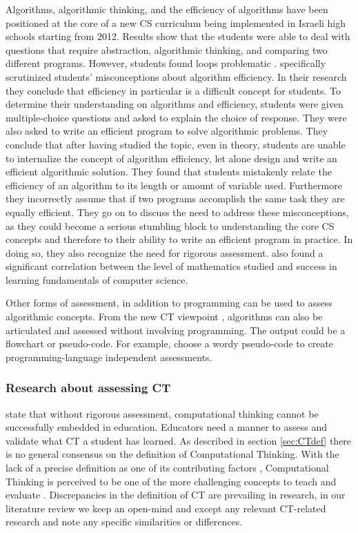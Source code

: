 Algorithms, algorithmic thinking, and the efficiency of algorithms have been positioned at the core of a new CS curriculum being implemented in Israeli high schools starting from 2012. Results show that the students were able to deal with questions that require abstraction, algorithmic thinking, and comparing two different programs. However, students found loops problematic \cite{zur-burgury2013israelExam}.  specifically scrutinized students' misconceptions about algorithm efficiency. In their research they conclude that efficiency in particular is a difficult concept for students. To determine their understanding on algorithms and efficiency, students were given multiple-choice questions and asked to explain the choice of response. They were also asked to write an efficient program to solve algorithmic problems. They conclude that after having studied the topic, even in theory, students are unable to internalize the concept of algorithm efficiency, let alone design and write an efficient algorithmic solution. They found that students mistakenly relate the efficiency of an algorithm to its length or amount of variable used. Furthermore they incorrectly assume that if two programs accomplish the same task they are equally efficient. They go on to discuss the need to address these misconceptions, as they could become a serious stumbling block to understanding the core CS concepts and therefore to their ability to write an efficient program in practice. In doing so, they also recognize the need for rigorous assessment. \cite{gal2002efficiency} also found a significant correlation between the level of mathematics studied and success in learning fundamentals of computer science.


Other forms of assessment, in addition to programming can be used to assess algorithmic concepts. From the new CT viewpoint \cite{denning2017remaining}, algorithms can also be articulated and assessed without involving programming. The output could be a flowchart \cite{Smetsers2017} or pseudo-code. For example,  choose a wordy pseudo-code to create programming-language independent assessments.


\subsubsection{Research about assessing CT}

 state that without rigorous assessment, computational thinking cannot be successfully embedded in education. Educators need a manner to assess and validate what CT a student has learned. As described in section \ref{sec:CTdef} there is no general consensus on the definition of Computational Thinking. With the lack of a precise definition as one of its contributing factors \cite{crick2017}, Computational Thinking is perceived to be one of the more challenging concepts to teach and evaluate \cite{BrennanResnick2012}. Discrepancies in the definition of CT are prevailing in research, in our literature review we keep an open-mind and except any relevant CT-related research and note any specific similarities or differences.


